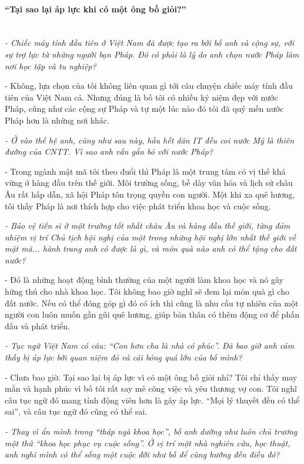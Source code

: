 \paragraph{“Tại sao lại áp lực khi có một ông bố giỏi?”}\ \\
\textit{- Chiếc máy tính đầu tiên ở Việt Nam đã được tạo ra bởi bố anh và cộng sự, với sự trợ lực từ những người bạn Pháp. Đó có phải là lý do anh chọn nước Pháp làm nơi học tập và tu nghiệp?}

- Không, lựa chọn của tôi không liên quan gì tới câu chuyện chiếc máy tính đầu tiên của Việt Nam cả. Nhưng đúng là bố tôi có nhiều kỷ niệm đẹp với nước Pháp, cũng như các cộng sự Pháp và tự một lúc nào đó tôi đã quý mến nước Pháp hơn là những nơi khác.

\textit{- Ở vào thế hệ anh, cũng như sau này, hầu hết dân IT đều coi nước Mỹ là thiên đường của CNTT. Vì sao anh vẫn gắn bó với nước Pháp?}

- Trong ngành mật mã tôi theo đuổi thì Pháp là một trung tâm có vị thế khá vững ở hàng đầu trên thế giới. Môi trường sống, bề dày văn hóa và lịch sử châu Âu rất hấp dẫn, xã hội Pháp tôn trọng quyền con người. Một khi xa quê hương, tôi thấy Pháp là nơi thích hợp cho việc phát triển khoa học và cuộc sống.

\textit{- Bảo vệ tiến sĩ ở một trường tốt nhất châu Âu và hàng đầu thế giới, từng đảm nhiệm vị trí Chủ tịch hội nghị của một trong những hội nghị lớn nhất thế giới về mật mã... hành trang anh có được là gì, và món quà nào anh có thể tặng cho đất nước?}

- Đó là những hoạt động bình thường của một người làm khoa học và nó gây hứng thú cho nhà khoa học. Tôi không bao giờ nghĩ sẽ đem lại món quà gì cho đất nước. Nếu có thể đóng góp gì đó có ích thì cũng là nhu cầu tự nhiên của một người con luôn muốn gần gũi quê hương, giúp bản thân có thêm động cơ để phấn đấu và phát triển.

\textit{- Tục ngữ Việt Nam có câu: “Con hơn cha là nhà có phúc”. Đã bao giờ anh cảm thấy bị áp lực bởi quan niệm đó và cái bóng quá lớn của bố mình?}

- Chưa bao giờ. Tại sao lại bị áp lực vì có một ông bố giỏi nhỉ? Tôi chỉ thấy may mắn và hạnh phúc vì bố tôi rất say mê công việc và yêu thương vợ con. Tôi nghĩ câu tục ngữ đó mang tính động viên hơn là gây áp lực. “Mọi lý thuyết đều có thể sai”, và câu tục ngữ đó cũng có thể sai.  

\textit{- Thay vì ẩn mình trong “tháp ngà khoa học”, bố anh dường như luôn chủ trương một thứ “khoa học phục vụ cuộc sống”.  Ở vị trí một nhà nghiên cứu, học thuật, anh nghĩ mình có thể sống một cuộc đời như bố để cùng hướng đến điều đó?}

